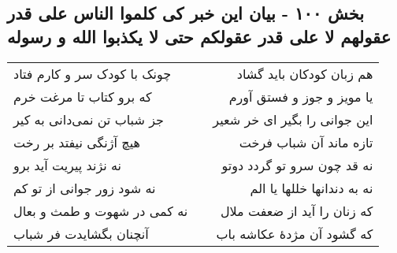 \begin{center}
\section*{بخش ۱۰۰ - بیان این خبر کی کلموا الناس علی قدر عقولهم لا علی قدر عقولکم حتی لا یکذبوا الله و رسوله}
\label{sec:sh100}
\begin{longtable}{l p{0.5cm} r}
چونک با کودک سر و کارم فتاد
&&
هم زبان کودکان باید گشاد
\\
که برو کتاب تا مرغت خرم
&&
یا مویز و جوز و فستق آورم
\\
جز شباب تن نمی‌دانی به کیر
&&
این جوانی را بگیر ای خر شعیر
\\
هیچ آژنگی نیفتد بر رخت
&&
تازه ماند آن شباب فرخت
\\
نه نژند پیریت آید برو
&&
نه قد چون سرو تو گردد دوتو
\\
نه شود زور جوانی از تو کم
&&
نه به دندانها خللها یا الم
\\
نه کمی در شهوت و طمث و بعال
&&
که زنان را آید از ضعفت ملال
\\
آنچنان بگشایدت فر شباب
&&
که گشود آن مژدهٔ عکاشه باب
\\
\end{longtable}
\end{center}

